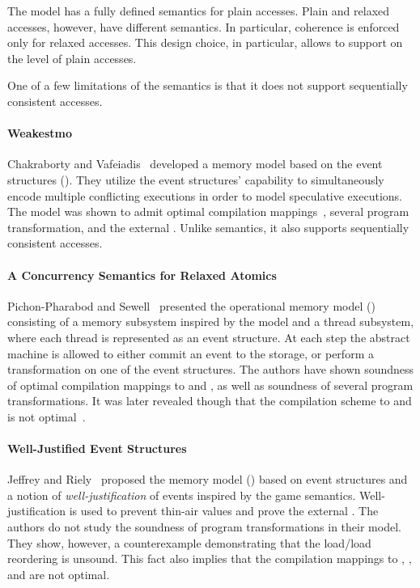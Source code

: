 The model has a fully defined semantics for plain accesses.  
Plain and relaxed accesses, however, have different semantics.
In particular, coherence is enforced only for relaxed accesses. 
This design choice, in particular, allows to support 
\CSE on the level of plain accesses. 

One of a few limitations of the \Promising semantics is that 
it does not support sequentially consistent accesses. 

\paragraph{Weakestmo}

Chakraborty and Vafeiadis~\cite{Chakraborty-Vafeiadis:CGO17, Chakraborty-Vafeiadis:POPL19}
developed a memory model based on the event structures (\WMO). 
They utilize the event structures' capability to simultaneously encode 
multiple conflicting executions in order to model speculative executions.
The model was shown to admit optimal compilation mappings~\cite{Moiseenko-al:ECOOP20},
several program transformation, and the external \DRF.
Unlike \Promising semantics, it also supports 
sequentially consistent accesses.

\paragraph{A Concurrency Semantics for Relaxed Atomics}

Pichon-Pharabod and Sewell~\cite{PichonPharabod-Sewell:POPL16} 
presented the operational memory model (\CSRA) consisting of 
a memory subsystem inspired by the \POWER model 
and a thread subsystem, 
where each thread is represented as an event structure. 
At each step the abstract machine is allowed to either 
commit an event to the storage, or perform a transformation 
on one of the event structures. 
The authors have shown soundness of 
optimal compilation mappings to \Intel and \POWER, 
as well as soundness of several program transformations.
It was later revealed though that the compilation scheme
to  and  is not optimal~\cite{PichonPharabod:PhD18}.

\paragraph{Well-Justified Event Structures}

Jeffrey and Riely~\cite{Jeffrey-Riely:LICS16} proposed 
the memory model (\WJES) based on event structures and a notion of 
\emph{well-justification} of events inspired by the game semantics. 
Well-justification is used to prevent thin-air values 
and prove the external \DRF. The authors do not study 
the soundness of program transformations in their model. 
They show, however, a counterexample demonstrating that 
the load/load reordering is unsound. 
This fact also implies that 
the compilation mappings to , , and \POWER 
are not optimal.   

